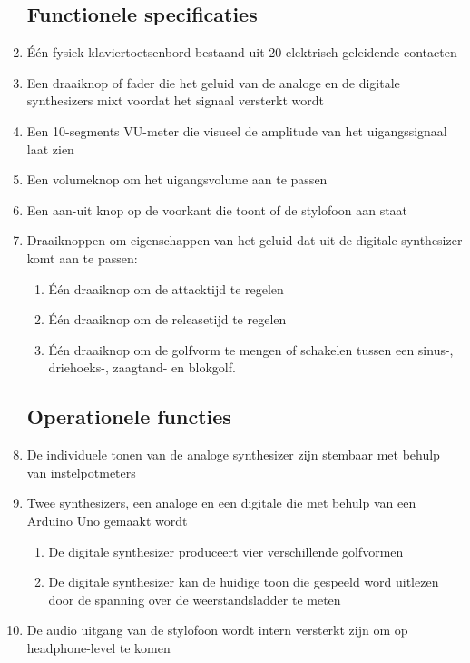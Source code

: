 \documentclass[12pt, a4paper, dutch]{article}
\begin{document}
\begin{enumerate}
\subsection{Functionele specificaties}
	\item \label{req:20keys} \'E\'en fysiek klaviertoetsenbord bestaand uit 20
		elektrisch geleidende contacten
	\item \label{req:mixfader} Een draaiknop of fader die het geluid van de analoge en
		de digitale synthesizers mixt voordat het signaal versterkt wordt
	\item \label{req:vumeter} Een 10-segments VU-meter die visueel de amplitude van het
		uigangssignaal laat zien
	\item \label{req:volknob} Een volumeknop om het uigangsvolume aan te passen
	\item \label{req:powerbutton} Een aan-uit knop op de voorkant die toont of de stylofoon
		aan staat
	\item \label{req:digsoundtweak} Draaiknoppen om eigenschappen van het geluid dat
		uit de digitale synthesizer komt aan te passen:
	\begin{enumerate}
		\item \label{req:attack} \'E\'en draaiknop om de attacktijd te regelen
		\item \label{req:release} \'E\'en draaiknop om de releasetijd te regelen
		\item \label{req:wavform} \'E\'en draaiknop om de golfvorm te mengen of schakelen
			tussen een sinus-, driehoeks-, zaagtand- en blokgolf.
	\end{enumerate}
\subsection{Operationele functies}
	\item \label{req:tuneable} De individuele tonen van de analoge synthesizer zijn
		stembaar met behulp van instelpotmeters
	\item \label{req:engines} Twee synthesizers, een analoge en een digitale die met
		behulp van een Arduino Uno gemaakt wordt
	\begin{enumerate}
		\item \label{req:wavforms} De digitale synthesizer produceert vier verschillende
			golfvormen
		\item \label{req:readtone} De digitale synthesizer kan de huidige toon die
			gespeeld word uitlezen door de spanning over de weerstandsladder te meten
	\end{enumerate}
	\item \label{req:phonesout} De audio uitgang van de stylofoon wordt intern
		versterkt zijn om op headphone-level te komen

\end{enumerate}
\end{document}
